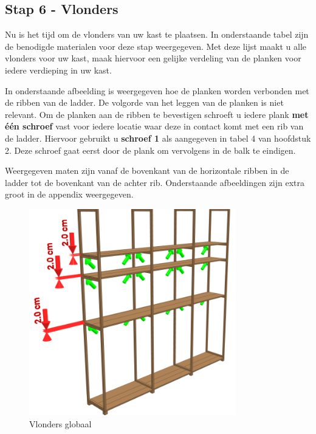 \documentclass{article}
\begin{document}
\subsection{Stap 6 - Vlonders}

Nu is het tijd om de vlonders van uw kast te plaatsen. In onderstaande tabel zijn de benodigde materialen voor deze stap weergegeven. Met deze lijst maakt u alle vlonders voor uw kast, maak hiervoor een gelijke verdeling van de planken voor iedere verdieping in uw kast.



In onderstaande afbeelding is weergegeven hoe de planken worden verbonden met de ribben van de ladder. De volgorde van het leggen van de planken is niet relevant. Om de planken aan de ribben te bevestigen schroeft u iedere plank \textbf{met \'{e}\'{en} schroef} vast voor iedere locatie waar deze in contact komt met een rib van de ladder. Hiervoor gebruikt u \textbf{schroef 1} als aangegeven in tabel 4 van hoofdstuk 2. Deze schroef gaat eerst door de plank om vervolgens in de balk te eindigen.

Weergegeven maten zijn vanaf de bovenkant van de horizontale ribben in de ladder tot de bovenkant van de achter rib. Onderstaande afbeeldingen zijn extra groot in de appendix weergegeven.

\begin{figure}[h!]
    \centering
    \includegraphics[width=0.8\textwidth]{scene 6 - vlonders a.png}
    \caption{Vlonders globaal}
    \label{fig:stap 6a}
\end{figure}
\end{document}
